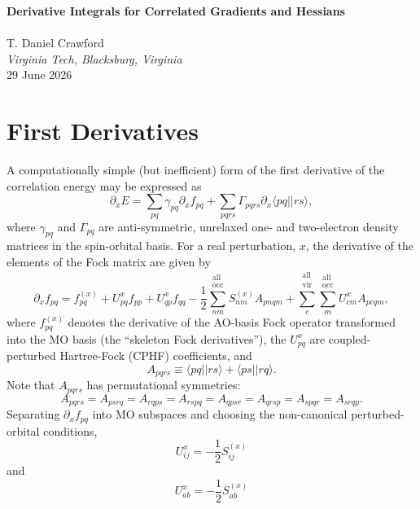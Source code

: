 \documentclass[12pt]{article}
\def\ket#1{| #1 \rangle}
\def\bra#1{\langle #1 |}
\def\aint#1#2{\bra{#1}\ket{#2}}
\newcommand{\allocc}{\substack{\textrm{all}{}\\\textrm{occ}}}
\newcommand{\allvir}{\substack{\textrm{all}{}\\\textrm{vir}}}
\begin{document}
\begin{center}
{\bf \large Derivative Integrals for Correlated Gradients and Hessians} \\
\ \\
T. Daniel Crawford \\
{\em Virginia Tech, Blacksburg, Virginia} \\
29 June 2026
\end{center}

\section{First Derivatives}

\noindent
A computationally simple (but inefficient) form of the first derivative of the correlation energy may be expressed as
\begin{equation}
\partial_x E = \sum_{pq} \gamma_{pq} \partial_x f_{pq} + \sum_{pqrs}
\Gamma_{pqrs} \partial_x \aint{pq}{rs},
\label{Eq:dx_E}
\end{equation}
where $\gamma_{pq}$ and $\Gamma_{pq}$ are anti-symmetric, unrelaxed one- and
two-electron density matrices in the spin-orbital basis.
For a real perturbation, $x$, the derivative of the elements of the Fock matrix are given by
\begin{equation}
\partial_x f_{pq} = f_{pq}^{(x)} + U_{pq}^x f_{pp} + U_{qp}^x f_{qq} 
- \frac{1}{2} \sum_{nm}^{\allocc} S_{nm}^{(x)} A_{pnqm}
+ \sum_c^{\allvir} \sum_m^{\allocc} U_{cm}^x A_{pcqm},
\label{Eq:dx_f_pq}
\end{equation}
where $f_{pq}^{(x)}$ denotes the derivative of the AO-basis Fock operator
transformed into the MO basis (the ``skeleton Fock derivatives''), the
$U_{pq}^x$ are coupled-perturbed Hartree-Fock (CPHF) coefficients, and
\begin{equation}
A_{pqrs} \equiv \aint{pq}{rs} + \aint{ps}{rq}.
\end{equation}
Note that $A_{pqrs}$ has permutational symmetries:
\begin{equation}
A_{pqrs} = A_{psrq} = A_{rqps} = A_{rspq} = A_{qpsr} = A_{qrsp} = A_{spqr} = A_{srqp}.
\end{equation}
Separating $\partial_x f_{pq}$ into MO subspaces and choosing the non-canonical perturbed-orbital conditions, 
\begin{equation}
U_{ij}^x = -\frac{1}{2} S_{ij}^{(x)}
\end{equation}
and
\begin{equation}
U_{ab}^x = -\frac{1}{2} S_{ab}^{(x)}
\end{equation}
\end{document}

